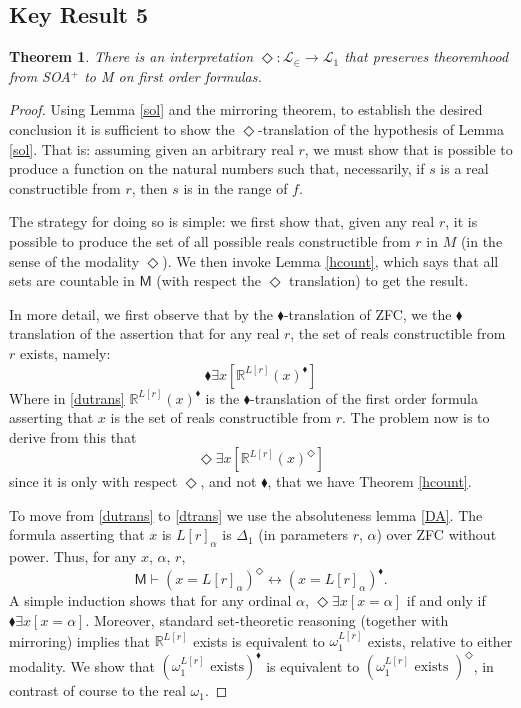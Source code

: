 \documentclass{article}
\newcommand\D{\blacklozenge}
\newtheorem{theorem}{Theorem}
\begin{document}
\subsection{Key Result 5}
\begin{theorem}
    There is an interpretation $\Diamond: \mathcal{L}_\in \to \mathcal{L}_1$ that preserves theoremhood from SOA$^+$ to M 
    \emph{on first order formulas}. 
\end{theorem}
\begin{proof}
    Using Lemma \ref{sol} and the mirroring theorem, to establish 
the desired conclusion it is sufficient to show the $\Diamond$-translation 
of the hypothesis of Lemma \ref{sol}. That is: assuming given an arbitrary real $r$, 
we must show that is possible to produce a function on the natural numbers such that, 
necessarily, if $s$ is a real constructible from $r$, 
then $s$ is in the range of $f$.

The strategy for doing so is simple: we first show that, given any real $r$, 
it is possible to produce the set of all possible reals constructible from $r$ in 
$M$ (in the sense of the modality $\Diamond$). We then invoke Lemma \ref{hcount}, which 
says that all sets are countable in $\mathsf{M}$ (with respect the $\Diamond$ translation)
to get the result.

In more detail,
we first observe that by the $\D$-translation of ZFC, 
we the $\D$ translation of the assertion that for any real $r$, the 
set of reals constructible from $r$ exists, namely:
\begin{equation}\label{dutrans}
    \D \exists x [\mathbb{R}^{L[r]}(x)^{\D}]
\end{equation}
Where in \eqref{dutrans} $\mathbb{R}^{L[r]}(x)^{\D}$ is the $\D$-translation of the first order 
formula asserting that $x$ 
is the set of reals constructible from $r$. The problem now is to derive from this 
that 
\begin{equation}\label{dtrans}
    \Diamond \exists x [\mathbb{R}^{L[r]}(x)^{\Diamond}]
\end{equation}
since it is only with respect $\Diamond$, and not $\D$, that we have Theorem \ref{hcount}.

To move from \eqref{dutrans} to \eqref{dtrans} we use the absoluteness 
lemma \ref{DA}. The formula asserting that $x$ is $L[r]_\alpha$ is $\Delta_1$ 
(in parameters $r$, $\alpha$) 
over ZFC without power. Thus, for any $x$, $\alpha$, $r$, 
\begin{equation}\label{butt}\mathsf{M} \vdash (x = L[r]_\alpha)^\Diamond \leftrightarrow
(x = L[r]_\alpha)^{\D}.\end{equation}
A simple induction shows that for any ordinal $\alpha$, $\Diamond \exists x[ x = \alpha]$ if and only if 
$\D \exists x[x = \alpha]$.
Moreover, standard set-theoretic reasoning (together with mirroring) 
implies that $\mathbb{R}^{L[r]}$ exists is equivalent to $\omega_1^{L[r]}$
exists, relative to either modality. 
We show that $(\omega_1^{L[r]} \text{ exists})^{\D}$ is equivalent to 
$(\omega_1^{L[r]} \text{ exists })^\Diamond$, 
in contrast of course to the real $\omega_1$.


\end{proof}
\end{document}
